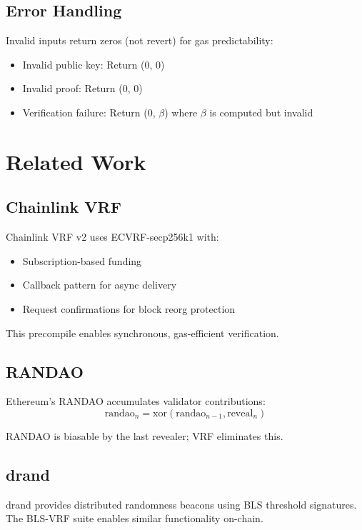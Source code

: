 \documentclass[11pt,a4paper]{article}
\theoremstyle{definition}
\begin{document}
\subsection{Error Handling}

Invalid inputs return zeros (not revert) for gas predictability:
\begin{itemize}
    \item Invalid public key: Return (0, 0)
    \item Invalid proof: Return (0, 0)
    \item Verification failure: Return (0, $\beta$) where $\beta$ is computed but invalid
\end{itemize}

\section{Related Work}

\subsection{Chainlink VRF}

Chainlink VRF v2 uses ECVRF-secp256k1 with:
\begin{itemize}
    \item Subscription-based funding
    \item Callback pattern for async delivery
    \item Request confirmations for block reorg protection
\end{itemize}

This precompile enables synchronous, gas-efficient verification.

\subsection{RANDAO}

Ethereum's RANDAO accumulates validator contributions:
\[
\text{randao}_n = \text{xor}(\text{randao}_{n-1}, \text{reveal}_n)
\]

RANDAO is biasable by the last revealer; VRF eliminates this.

\subsection{drand}

drand provides distributed randomness beacons using BLS threshold signatures. The BLS-VRF suite enables similar functionality on-chain.
\end{document}
